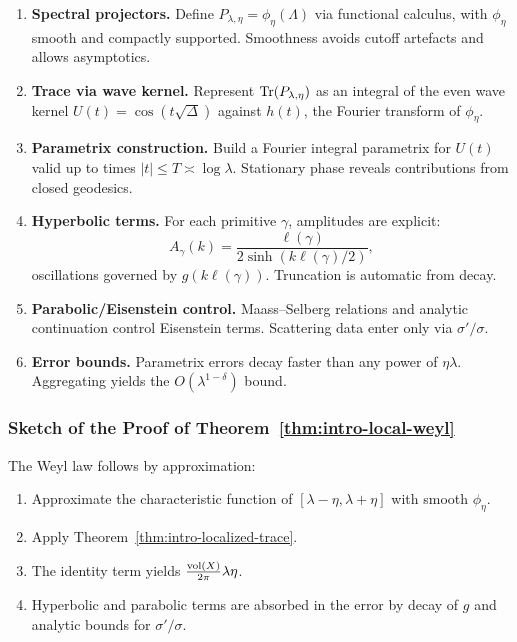 \begin{enumerate}[label=\arabic*.]
  \item \textbf{Spectral projectors.}
        Define $P_{\lambda,\eta}=\phi_\eta(\Lambda)$ via functional calculus,
        with $\phi_\eta$ smooth and compactly supported.
        Smoothness avoids cutoff artefacts and allows asymptotics.

  \item \textbf{Trace via wave kernel.}
        Represent $\operatorname{Tr}(P_{\lambda,\eta})$ as an integral of the even wave kernel
        $U(t)=\cos(t\sqrt{\Delta})$ against $h(t)$, the Fourier transform of $\phi_\eta$.

  \item \textbf{Parametrix construction.}
        Build a Fourier integral parametrix for $U(t)$ valid up to times $|t|\le T\asymp\log\lambda$.
        Stationary phase reveals contributions from closed geodesics.

  \item \textbf{Hyperbolic terms.}
        For each primitive $\gamma$, amplitudes are explicit:
        \[
          A_\gamma(k) = \frac{\ell(\gamma)}{2\sinh(k\ell(\gamma)/2)},
        \]
        oscillations governed by $g(k\ell(\gamma))$.
        Truncation is automatic from decay.

  \item \textbf{Parabolic/Eisenstein control.}
        Maass–Selberg relations and analytic continuation control Eisenstein terms.
        Scattering data enter only via $\sigma'/\sigma$.

  \item \textbf{Error bounds.}
        Parametrix errors decay faster than any power of $\eta\lambda$.
        Aggregating yields the $O(\lambda^{1-\delta})$ bound.
\end{enumerate}

\subsubsection*{Sketch of the Proof of Theorem~\ref{thm:intro-local-weyl}}

The Weyl law follows by approximation:

\begin{enumerate}[label=\arabic*.]
  \item Approximate the characteristic function of $[\lambda-\eta,\lambda+\eta]$
        with smooth $\phi_\eta$.
  \item Apply Theorem~\ref{thm:intro-localized-trace}.
  \item The identity term yields $\tfrac{\operatorname{vol}(X)}{2\pi}\lambda\eta$.
  \item Hyperbolic and parabolic terms are absorbed in the error
        by decay of $g$ and analytic bounds for $\sigma'/\sigma$.
\end{enumerate}

